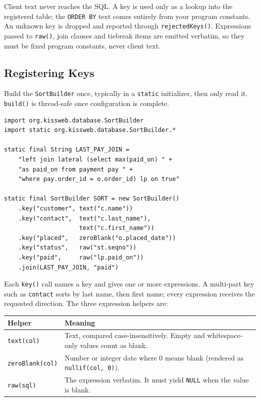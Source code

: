\begin{warnbox}[Security]
Client text never reaches the SQL.  A key is used only as a lookup into the registered table; the \texttt{ORDER BY} text comes entirely from your program constants.  An unknown key is dropped and reported through \texttt{rejectedKeys()}.  Expressions passed to \texttt{raw()}, join clauses and tiebreak items are emitted verbatim, so they must be fixed program constants, never client text.
\end{warnbox}

\subsection{Registering Keys}

Build the \texttt{SortBuilder} once, typically in a \texttt{static} initializer, then only read it.  \texttt{build()} is thread-safe once configuration is complete.

\begin{lstlisting}[style=groovy]
import org.kissweb.database.SortBuilder
import static org.kissweb.database.SortBuilder.*

static final String LAST_PAY_JOIN =
    "left join lateral (select max(paid_on) " +
    "as paid_on from payment pay " +
    "where pay.order_id = o.order_id) lp on true"

static final SortBuilder SORT = new SortBuilder()
    .key("customer", text("c.name"))
    .key("contact",  text("c.last_name"),
                     text("c.first_name"))
    .key("placed",   zeroBlank("o.placed_date"))
    .key("status",   raw("st.seqno"))
    .key("paid",     raw("lp.paid_on"))
    .join(LAST_PAY_JOIN, "paid")
\end{lstlisting}

Each \texttt{key()} call names a key and gives one or more expressions.  A multi-part key such as \texttt{contact} sorts by last name, then first name; every expression receives the requested direction.  The three expression helpers are:

\begin{longtable}{P{3.4cm}P{7.1cm}}
\toprule
\textbf{Helper} & \textbf{Meaning} \\
\midrule
\endhead
\texttt{text(col)} & Text, compared case-insensitively.  Empty and whitespace-only values count as blank. \\
\texttt{zeroBlank(col)} & Number or integer date where 0 means blank (rendered as \texttt{nullif(col, 0)}). \\
\texttt{raw(sql)} & The expression verbatim.  It must yield \texttt{NULL} when the value is blank. \\
\bottomrule
\end{longtable}

